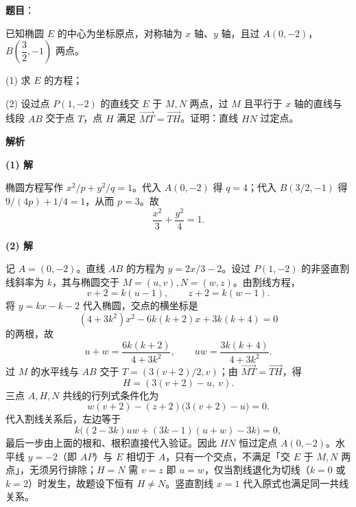 \begin{answer}

\textbf{题目}：

已知椭圆 $E$ 的中心为坐标原点，对称轴为 $x$ 轴、$y$ 轴，且过 $A(0,-2)$，$B\left(\dfrac32,-1\right)$ 两点。

(1) 求 $E$ 的方程；

(2) 设过点 $P(1,-2)$ 的直线交 $E$ 于 $M,N$ 两点，过 $M$ 且平行于 $x$ 轴的直线与线段 $AB$ 交于点 $T$，点 $H$ 满足 $\overrightarrow{MT}=\overrightarrow{TH}$。证明：直线 $HN$ 过定点。

\textbf{解析}

\textbf{(1) 解}

椭圆方程写作 $x^2/p+y^2/q=1$。代入 $A(0,-2)$ 得 $q=4$；代入 $B(3/2,-1)$ 得 $9/(4p)+1/4=1$，从而 $p=3$。故
\nopagebreak[4]
\[
\frac{x^2}{3}+\frac{y^2}{4}=1.
\]

\textbf{(2) 解}

记 $A=(0,-2)$。直线 $AB$ 的方程为 $y=2x/3-2$。设过 $P(1,-2)$ 的非竖直割线斜率为 $k$，其与椭圆交于 $M=(u,v),N=(w,z)$。由割线方程，
\nopagebreak[4]
\[
v+2=k(u-1),\qquad z+2=k(w-1).
\]
将 $y=kx-k-2$ 代入椭圆，交点的横坐标是
\nopagebreak[4]
\[
(4+3k^2)x^2-6k(k+2)x+3k(k+4)=0
\]
的两根，故
\nopagebreak[4]
\[
u+w=\frac{6k(k+2)}{4+3k^2},\qquad
uw=\frac{3k(k+4)}{4+3k^2}.
\]
过 $M$ 的水平线与 $AB$ 交于 $T=(3(v+2)/2,v)$；由 $\overrightarrow{MT}=\overrightarrow{TH}$，得
\nopagebreak[4]
\[
H=(3(v+2)-u,\ v).
\]
三点 $A,H,N$ 共线的行列式条件化为
\nopagebreak[4]
\[
w(v+2)-(z+2)\bigl(3(v+2)-u\bigr)=0.
\]
代入割线关系后，左边等于
\nopagebreak[4]
\[
k\bigl((2-3k)uw+(3k-1)(u+w)-3k\bigr)=0,
\]
最后一步由上面的根和、根积直接代入验证。因此 $HN$ 恒过定点 $A(0,-2)$。水平线 $y=-2$（即 $AP$）与 $E$ 相切于 $A$，只有一个交点，不满足「交 $E$ 于 $M,N$ 两点」，无须另行排除；$H=N$ 需 $v=z$ 即 $u=w$，仅当割线退化为切线（$k=0$ 或 $k=2$）时发生，故题设下恒有 $H\ne N$。竖直割线 $x=1$ 代入原式也满足同一共线关系。



\end{answer}
